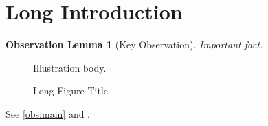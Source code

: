 \section[Short Intro]{Long Introduction}
\newtheorem{oblemma}{Observation Lemma}[section]
\begin{oblemma}[Key Observation]\label{obs:main}
Important fact.
\end{oblemma}
\begin{figure}
\caption[Short Figure]{Long Figure Title}\label{fig:first}
Illustration body.
\end{figure}
See \autoref{obs:main} and .
